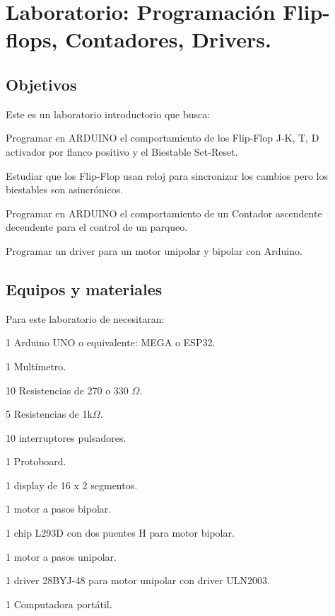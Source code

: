 
	

\chapter{Laboratorio: Programación Flip-flops, Contadores, Drivers.}


\section{Objetivos}
Este es un laboratorio introductorio que busca:
\begin{itemize}
	{\small
	 \item  Programar en ARDUINO el comportamiento de los Flip-Flop J-K, T, D activador por flanco positivo y el Biestable Set-Reset.
	 \item  Estudiar que los Flip-Flop usan reloj para sincronizar los cambios pero los biestables son asincrónicos.
	 \item  Programar en ARDUINO el comportamiento de un Contador ascendente decendente para el control de un parqueo.
	 \item  Programar un driver para un motor unipolar y bipolar con Arduino.
 }
\end{itemize} 


\section{Equipos y materiales}
Para este laboratorio de necesitaran:
\begin{itemize}
	{\small \item 1 Arduino UNO o equivalente: MEGA o ESP32.
	\item 1 Multímetro.
	\item 10 Resistencias de 270 o 330 $\Omega$.
	\item 5 Resistencias de 1k$\Omega$.
	\item 10 interruptores pulsadores.
	\item 1 Protoboard.
	\item 1 display de 16 x 2 segmentos.
	\item 1 motor a pasos bipolar.
	\item 1 chip L293D con dos puentes H para motor bipolar.
	\item 1 motor a pasos unipolar. 
	\item 1 driver 28BYJ-48 para motor unipolar con driver  ULN2003.
	\item 1 Computadora portátil.}
\end{itemize}

